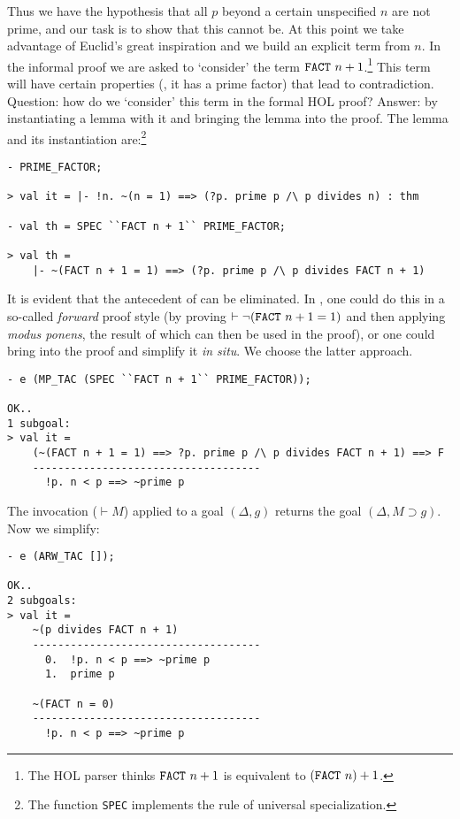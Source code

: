 Thus we have the hypothesis that all $p$ beyond a certain unspecified
$n$ are not prime, and our task is to show that this cannot be. At this
point we take advantage of Euclid's great inspiration and we build an
explicit term from $n$. In the informal proof we are asked to `consider'
the term $\mbox{\tt FACT}\ n + 1$.\footnote{The HOL parser thinks
$\mbox{\tt FACT}\ n + 1$ is equivalent to $(\mbox{\tt FACT}\ n) + 1$.}
This term will have certain properties (\ie, it has a prime factor) that
lead to contradiction. Question: how do we `consider' this term in the
formal HOL proof? Answer: by instantiating a lemma with it and bringing the
lemma into the proof. The lemma and its instantiation are:\footnote{The
function {\tt SPEC} implements the rule of universal specialization.}
\begin{session}\begin{verbatim}
- PRIME_FACTOR;

> val it = |- !n. ~(n = 1) ==> (?p. prime p /\ p divides n) : thm

- val th = SPEC ``FACT n + 1`` PRIME_FACTOR;

> val th =
    |- ~(FACT n + 1 = 1) ==> (?p. prime p /\ p divides FACT n + 1)
\end{verbatim}\end{session}
It is evident that the antecedent of  can be eliminated. In
\holn{}, one could do this in a so-called {\it forward\/} proof style (by
proving $\vdash \neg(\mbox{\tt FACT}\ n + 1 = 1)$ and then applying {\it
modus ponens}, the result of which can then be used in the proof), or
one could bring  into the proof and simplify it {\it in
situ}. We choose the latter approach.
\begin{session}\begin{verbatim}
- e (MP_TAC (SPEC ``FACT n + 1`` PRIME_FACTOR));

OK..
1 subgoal:
> val it =
    (~(FACT n + 1 = 1) ==> ?p. prime p /\ p divides FACT n + 1) ==> F
    ------------------------------------
      !p. n < p ==> ~prime p
\end{verbatim}\end{session}
    The invocation  ($\vdash M$) applied to a goal
    $(\Delta, g)$ returns the goal $(\Delta, M \supset g)$. Now we
    simplify:
\begin{session}\begin{verbatim}
- e (ARW_TAC []);

OK..
2 subgoals:
> val it =
    ~(p divides FACT n + 1)
    ------------------------------------
      0.  !p. n < p ==> ~prime p
      1.  prime p

    ~(FACT n = 0)
    ------------------------------------
      !p. n < p ==> ~prime p
\end{verbatim}\end{session}
